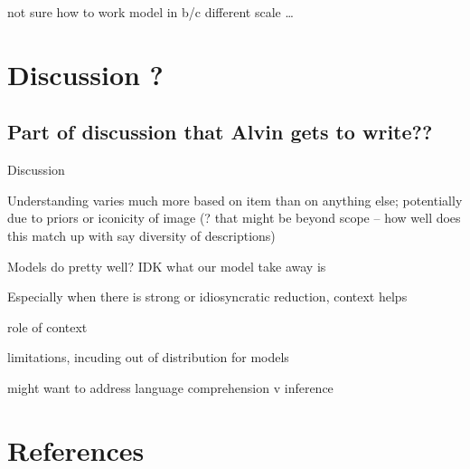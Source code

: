 \documentclass[10pt, letterpaper]{article}
\begin{document}
not sure how to work model in b/c different scale \ldots{}

\section{Discussion ?}\label{discussion}

\subsection{Part of discussion that Alvin gets to
write??}\label{part-of-discussion-that-alvin-gets-to-write}

Discussion

Understanding varies much more based on item than on anything else;
potentially due to priors or iconicity of image (? that might be beyond
scope -- how well does this match up with say diversity of descriptions)

Models do pretty well? IDK what our model take away is

Especially when there is strong or idiosyncratic reduction, context
helps

role of context

limitations, incuding out of distribution for models

might want to address language comprehension v inference

\section{References}\label{references}

\setlength{\parindent}{-0.1in} 
\setlength{\leftskip}{0.125in}

\noindent


\end{document}
